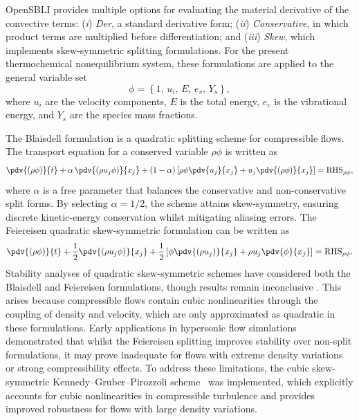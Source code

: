 OpenSBLI provides multiple options for evaluating the material derivative of the convective terms: (\textit{i}) \textit{Der}, a standard derivative form; (\textit{ii}) \textit{Conservative}, in which product terms are multiplied before differentiation; and (\textit{iii}) \textit{Skew}, which implements skew-symmetric splitting formulations. For the present thermochemical nonequilibrium system, these formulations are applied to the general variable set
\begin{equation}
    \phi = \left\{ 1, \, u_i, \, E, \, e_v, \, Y_s \right\},
\end{equation}
where $u_i$ are the velocity components, $E$ is the total energy, $e_v$ is the vibrational energy, and $Y_s$ are the species mass fractions.

The Blaisdell formulation \citep{BlaisdellEtAl1996} is a quadratic splitting scheme for compressible flows. The transport equation for a conserved variable $\rho \phi$ is written as
\begin{equation}
    \pdv{(\rho \phi)}{t} 
    + \alpha \, \pdv{(\rho u_j \phi)}{x_j} 
    + (1-\alpha) \left[ \rho \phi \pdv{u_j}{x_j} + u_j \pdv{(\rho \phi)}{x_j} \right] 
    = \text{RHS}_{\rho \phi},
    \label{eq:blaisdell}
\end{equation}
where $\alpha$ is a free parameter that balances the conservative and non-conservative split forms. By selecting $\alpha=1/2$, the scheme attains skew-symmetry, ensuring discrete kinetic-energy conservation whilst mitigating aliasing errors. The Feiereisen quadratic skew-symmetric formulation \citep{Feiereisen1981} can be written as
\begin{equation}
    \pdv{(\rho \phi)}{t} 
    + \frac{1}{2} \pdv{(\rho u_j \phi)}{x_j} 
    + \frac{1}{2} \left[ \phi \pdv{(\rho u_j)}{x_j} + \rho u_j \pdv{\phi}{x_j} \right] 
    = \text{RHS}_{\rho \phi}.
    \label{eq:feiereisen}
\end{equation}
Stability analyses of quadratic skew-symmetric schemes have considered both the Blaisdell and Feiereisen formulations, though results remain inconclusive \citep{BlaisdellEtAl1996,DucrosEtAl2000}. This arises because compressible flows contain cubic nonlinearities through the coupling of density and velocity, which are only approximated as quadratic in these formulations. Early applications in hypersonic flow simulations \citep{SjoegrenYee2010} demonstrated that whilst the Feiereisen splitting improves stability over non-split formulations, it may prove inadequate for flows with extreme density variations or strong compressibility effects. To address these limitations, the cubic skew-symmetric Kennedy--Gruber--Pirozzoli scheme~\citep{KennedyGruber2008,CoppolaEtAl2019,CoppolaEtAl2019b} was implemented, which explicitly accounts for cubic nonlinearities in compressible turbulence and provides improved robustness for flows with large density variations.

